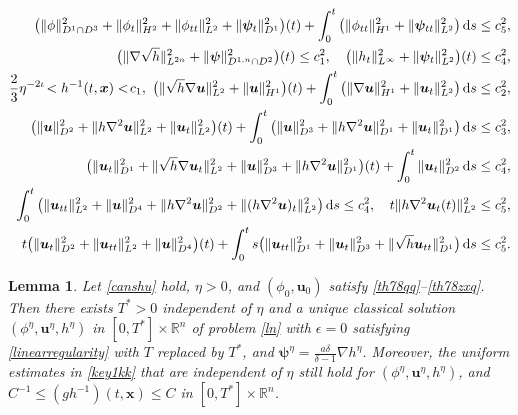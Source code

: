 \documentclass[10pt,a4paper]{amsart}
\newtheorem{lem}{Lemma}
\begin{document}
\begin{align}
\big(\|\phi\|^2_{D^1\cap D^3}+\|\phi_t\|^2_{H^2}+
\|\phi_{tt}\|^2_{L^2}+\|\boldsymbol{\psi}_t\|^2_{D^1}\big)(t)+\int^t_0\big(\|\phi_{tt}\|^2_{H^1}+\|\boldsymbol{\psi}_{tt}\|^2_{L^2}\big)\,\mathrm{d}s\leq  c_5^2,\notag\\
\big(\|\nabla\sqrt{h}\|^2_{L^{2n}}+
\|\boldsymbol{\psi}\|^2_{D^{1,n}\cap D^2}\big)(t)\leq c^2_1,\quad \big(\|h_t\|_{L^\infty}^2+\|\boldsymbol{\psi}_t\|^2_{L^2}\big)(t)\leq  c_4^2,\notag\\
\frac{2}{3}\eta^{-2\iota}\!<h^{-1}(t,\boldsymbol{x})<\!c_1, \  
\big(\|\sqrt{h}\nabla \boldsymbol{u}\|^2_{L^2}+\|\boldsymbol{u}\|^2_{H^1}\big)(t)+\int^t_0\big(\|\nabla \boldsymbol{u}\|^2_{H^1}+\|\boldsymbol{u}_t\|^2_{L^2}\big)\,\mathrm{d}s\leq c_2^2,\notag\\
\big(\|\boldsymbol{u}\|_{D^2}^2+\|h\nabla^2\boldsymbol{u}\|^2_{L^2}+\|\boldsymbol{u}_t\|^2_{L^2}\big)(t)+\int^t_0\big(\|\boldsymbol{u}\|^2_{D^3}+\|h\nabla^2\boldsymbol{u}\|_{D^1}^2+\|\boldsymbol{u}_t\|^2_{D^1}\big)\,\mathrm{d}s\leq  c_3^2,\label{key1kk}\\
\big(\|\boldsymbol{u}_t\|^2_{D^1}+\|\sqrt{h}\nabla \boldsymbol{u}_t\|^2_{L^2}+\|\boldsymbol{u}\|^2_{D^3}+\|h\nabla^2\boldsymbol{u}\|^2_{D^1}\big)(t)+\int^t_0\|\boldsymbol{u}_t\|^2_{D^2}\,\mathrm{d}s\leq  c_4^2,\notag\\
\int^t_0\big(\|\boldsymbol{u}_{tt}\|^2_{L^2}+\|\boldsymbol{u}\|^2_{D^4}+\|h\nabla^2\boldsymbol{u}\|^2_{D^2}+\|(h\nabla^2\boldsymbol{u})_t\|^2_{L^2}\big)\,\mathrm{d}s\leq  c_4^2,\quad t\|h\nabla^2\boldsymbol{u}_t(t)\|^2_{L^2}\leq  c_5^2,\notag\\
t\big(\|\boldsymbol{u}_t\|^2_{D^2}+\|\boldsymbol{u}_{tt}\|^2_{L^2}+\|\boldsymbol{u}\|^2_{D^4}\big)(t)+
\int^t_0s\big(\|\boldsymbol{u}_{tt}\|_{D^1}^2+\|\boldsymbol{u}_t\|^2_{D^3}+\|\sqrt{h} \boldsymbol{u}_{tt}\|_{D^1}^2\big)\,\mathrm{d}s\leq  c_5^2.\notag
\end{align}

\begin{lem}\label{epsilon0}
Let \eqref{canshu} hold, $\eta>0$, and $(\phi_0,\boldsymbol{u}_0)$ satisfy \eqref{th78qq}--\eqref{th78zxq}. Then there exists $T^*>0$ independent of $\eta$ and a unique classical solution $(\phi^\eta,\boldsymbol{u}^\eta, h^\eta)$ in $[0,T^*]\times\mathbb{R}^n$ of  problem \eqref{ln} with  $\epsilon=0$ satisfying \eqref{linearregularity} with $T$ replaced by $T^*$, and $\boldsymbol{\psi}^\eta=\frac{a\delta}{\delta-1}\nabla h^\eta$. Moreover, the uniform estimates in \eqref{key1kk} that are independent of $\eta$ still hold for $(\phi^\eta,\boldsymbol{u}^\eta,h^\eta)$, and $C^{-1}\leq (gh^{-1})(t,\boldsymbol{x})\leq C$ in $[0,T^*]\times\mathbb{R}^n$.
\end{lem}
\end{document}
